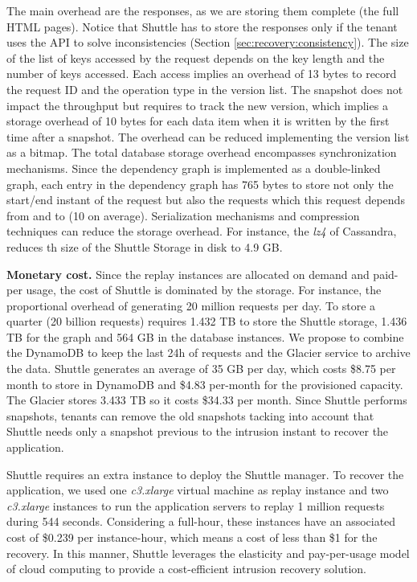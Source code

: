 The main overhead are the responses, as we are storing them complete (the full HTML pages). Notice that Shuttle has to store the responses only if the tenant uses the API to solve inconsistencies (Section \ref{sec:recovery:consistency}). The size of the list of keys accessed by the request depends on the key length and the number of keys accessed. Each access implies an overhead of 13 bytes to record the request ID and the operation type in the version list. The snapshot does not impact the throughput but requires to track the new version, which implies a storage overhead of 10 bytes for each data item when it is written by the first time after a snapshot. The overhead can be reduced implementing the version list as a bitmap. The total database storage overhead encompasses synchronization mechanisms. Since the dependency graph is implemented as a double-linked graph, each entry in the dependency graph has 765 bytes to store not only the start/end instant of the request but also the requests which this request depends from and to (10 on average). Serialization mechanisms and compression techniques can reduce the storage overhead. For instance, the \emph{lz4}  of Cassandra, reduces th size of the Shuttle Storage in disk to 4.9 GB.

\textbf{Monetary cost.}
%
Since the replay instances are allocated on demand and paid-per usage, the cost of Shuttle is dominated by the storage. For instance, the proportional overhead of generating 20 million requests per day. To store a quarter (20 billion requests) requires 1.432 TB to store the Shuttle storage, 1.436 TB for the graph and 564 GB in the database instances. We propose to combine the DynamoDB to keep the last 24h of requests and the Glacier service to archive the data. Shuttle generates an average of 35 GB per day, which costs \$8.75 per month to store in DynamoDB and \$4.83 per-month for the provisioned capacity. The Glacier stores 3.433 TB so it costs \$34.33 per month. Since Shuttle performs snapshots, tenants can remove the old snapshots tacking into account that Shuttle needs only a snapshot previous to the intrusion instant to recover the application.

Shuttle requires an extra instance to deploy the Shuttle manager. To recover the application, we used one \emph{c3.xlarge} virtual machine as replay instance and two  \emph{c3.xlarge} instances to run the application servers to replay 1 million requests during 544 seconds. Considering a full-hour, these instances have an associated cost of \$0.239 per instance-hour, which means a cost of less than \$1 for the recovery. In this manner, Shuttle leverages the elasticity and pay-per-usage model of cloud computing to provide a cost-efficient intrusion recovery solution.